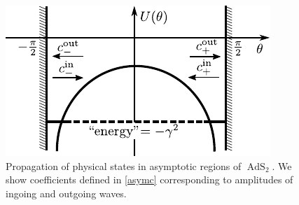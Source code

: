 \documentclass[11pt]{article}
\DeclareMathOperator{\tAdS}{\widetilde{AdS}}
\def\widetilde#1{#1}%
\begin{document}
\begin{figure}[t]
\centerline{
\includegraphics[scale=1.1]{prop} 
}
\caption{Propagation of physical states in asymptotic regions of $\tAdS_2$. We show coefficients defined in \eqref{asymc} corresponding to amplitudes of ingoing and outgoing waves.}
\label{fig:prop}
\end{figure}
\end{document}
